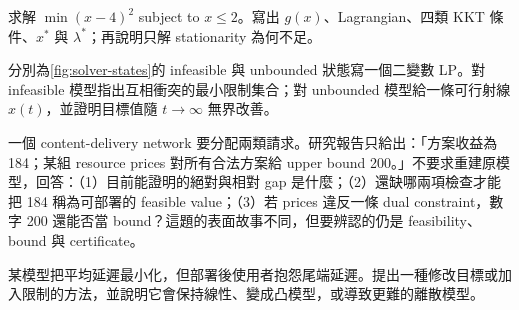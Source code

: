 \documentclass[11pt,a4paper,oneside,openany]{book}
\begin{document}
\begin{exercise}
求解 $\min (x-4)^2$ subject to $x\le2$。寫出 $g(x)$、Lagrangian、四類 KKT 條件、$x^*$ 與 $\lambda^*$；再說明只解 stationarity 為何不足。
\end{exercise}
\begin{exercise}
分別為\cref{fig:solver-states}的 infeasible 與 unbounded 狀態寫一個二變數 LP。對 infeasible 模型指出互相衝突的最小限制集合；對 unbounded 模型給一條可行射線 $x(t)$，並證明目標值隨 $t\to\infty$ 無界改善。
\end{exercise}
\begin{exercise}
一個 content-delivery network 要分配兩類請求。研究報告只給出：「方案收益為 184；某組 resource prices 對所有合法方案給 upper bound 200。」不要求重建原模型，回答：（1）目前能證明的絕對與相對 gap 是什麼；（2）還缺哪兩項檢查才能把 184 稱為可部署的 feasible value；（3）若 prices 違反一條 dual constraint，數字 200 還能否當 bound？這題的表面故事不同，但要辨認的仍是 feasibility、bound 與 certificate。
\end{exercise}
\begin{exercise}
某模型把平均延遲最小化，但部署後使用者抱怨尾端延遲。提出一種修改目標或加入限制的方法，並說明它會保持線性、變成凸模型，或導致更難的離散模型。
\end{exercise}
\end{document}
